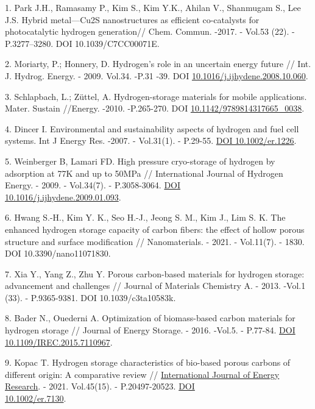 \begin{references}
1. Park J.H., Ramasamy P., Kim S., Kim Y.K., Ahilan V., Shanmugam S., Lee
J.S. Hybrid metal---Cu2S nanostructures as efficient co-catalysts for
photocatalytic hydrogen generation// Chem. Commun. -2017. - Vol.53
(22). - P.3277--3280. DOI 10.1039/C7CC00071E.

2. Moriarty, P.; Honnery, D. Hydrogen's role in an uncertain energy
future // Int. J. Hydrog. Energy. - 2009. Vol.34. -P.31 -39. DOI
\href{http://dx.doi.org/10.1016/j.ijhydene.2008.10.060}{10.1016/j.ijhydene.2008.10.060}.

3. Schlapbach, L.; Züttel, A. Hydrogen-storage materials for mobile
applications. Mater. Sustain //Energy. -2010. -P.265-270. DOI
\href{http://dx.doi.org/10.1142/9789814317665_0038}{10.1142/9789814317665\_0038}.

4. Dincer I. Environmental and sustainability aspects of hydrogen and
fuel cell systems. Int J Energy Res. -2007. - Vol.31(1). - P.29-55.
\href{https://doi.org/10.1002/er.1226}{DOI 10.1002/er.1226}.

5. Weinberger B, Lamari FD. High pressure cryo-storage of hydrogen by
adsorption at 77K and up to 50MPa // International Journal of Hydrogen
Energy. - 2009. - Vol.34(7). - P.3058-3064.
\href{https://doi.org/10.1016/j.ijhydene.2009.01.093}{DOI\\
10.1016/j.ijhydene.2009.01.093}.

6. Hwang S.-H., Kim Y. K., Seo H.-J., Jeong S. M., Kim J., Lim S. K. The
enhanced hydrogen storage capacity of carbon fibers: the effect of
hollow porous structure and surface modification // Nanomaterials. -
2021. - Vol.11(7). - 1830. DOI 10.3390/nano11071830.

7. Xia Y., Yang Z., Zhu Y. Porous carbon-based materials for hydrogen
storage: advancement and challenges // Journal of Materials Chemistry
A. - 2013. -Vol.1 (33). - P.9365-9381. DOI 10.1039/c3ta10583k.

8. Bader N., Ouederni A. Optimization of biomass-based carbon materials
for hydrogen storage // Journal of Energy Storage. - 2016. -Vol.5. -
P.77-84. \href{https://doi.org/10.1016/j.est.2015.12.009}{DOI
\href{http://dx.doi.org/10.1109/IREC.2015.7110967}{10.1109/IREC.2015.7110967}}.

9. Kopac T. Hydrogen storage characteristics of bio-based porous carbons
of different origin: A comparative review //
\href{https://onlinelibrary.wiley.com/journal/1099114x}{International
Journal of Energy Research}. - 2021. Vol.45(15). - P.20497-20523.
\href{https://doi.org/10.1002/er.7130}{DOI \\10.1002/er.7130}.


\end{references}
